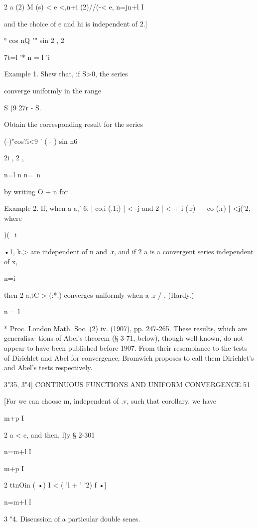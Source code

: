 2 a  (2) M  (s) < e <,n+i (2)//(-< e, 
n=jn+l I 

and the choice of e and hi is independent of 2.] 



°  cos nQ "" sin %
2 , 2 

7t=l '* n = l 'i 



Example 1. Shew that, if S>0, the series 

converge uniformly in the range 

S   (9   27r - S. 

Obtain the corresponding result for the series 

  (-)"cos?i<9 '  ( - )  sin n6 

2i , 2 , 

n=l n n=\ n 

by writing O + n for  . 

Example 2. If, when a a,' 6, | co,i (.1;) | <  -j and 2 | <   + i (.r) — co  (.r) | <j('2, where 

)(=i 

 •1, k.> are independent of n and .r, and if 2 a  is a convergent series independent of x, 

n=i 

then 2 a,tC > (:*;) converges uniformly when a  .r  / . (Hardy.) 

n = l 

* Proc. London Math. Soc. (2) iv. (1907), pp. 247-265. These results, which are generalisa- 
tions of Abel's theorem (§ 3-71, below), though well known, do not appear to have been published 
before 1907. From their resemblance to the tests of Dirichlet and Abel for convergence, 
Bromwich proposes to call them Dirichlet's and Abel's tests respectively. 



3"35, 3"4] CONTINUOUS FUNCTIONS AND UNIFORM CONVERGENCE 51 

[For we can choose m, independent of .v, such that 
corollary, we have 



m+p I 

2 a  < e, and then, l)y § 2-301 

n=m+l I 



m+p I 

2 ttnOin (  •) I < ( 'l + ' '2) f •] 



n=m+l I 

3 "4. Discussion of a particular double senes. 

